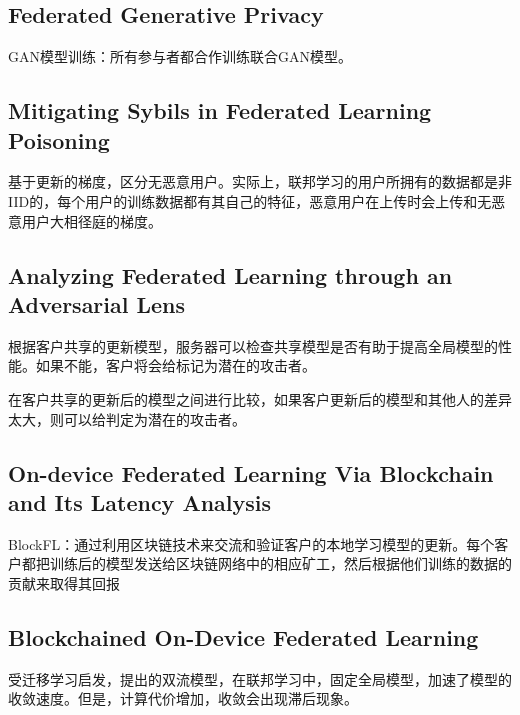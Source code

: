 \documentclass[12pt, a4paper]{article}
\begin{document}
        \subsection*{Federated Generative Privacy\cite{9091604}}
            GAN模型训练：所有参与者都合作训练联合​​GAN模型。
        \subsection*{Mitigating Sybils in Federated Learning Poisoning\cite{fung2020mitigating}}
            基于更新的梯度，区分无恶意用户。实际上，联邦学习的用户所拥有的数据都是非IID的，每个用户的训练数据都有其自己的特征，恶意用户在上传时会上传和无恶意用户大相径庭的梯度。
        \subsection*{Analyzing Federated Learning through an Adversarial Lens\cite{bhagoji2019analyzing}}
            根据客户共享的更新模型，服务器可以检查共享模型是否有助于提高全局模型的性能。如果不能，客户将会给标记为潜在的攻击者。

            在客户共享的更新后的模型之间进行比较，如果客户更新后的模型和其他人的差异太大，则可以给判定为潜在的攻击者。
        \subsection*{On-device Federated Learning Via Blockchain and Its Latency Analysis}
            BlockFL：通过利用区块链技术来交流和验证客户的本地学习模型的更新。每个客户都把训练后的模型发送给区块链网络中的相应矿工，然后根据他们训练的数据的贡献来取得其回报
        \subsection*{Blockchained On-Device Federated Learning\cite{kim2019blockchained}}
            受迁移学习启发，提出的双流模型，在联邦学习中，固定全局模型，加速了模型的收敛速度。但是，计算代价增加，收敛会出现滞后现象。


    
    
\end{document}
